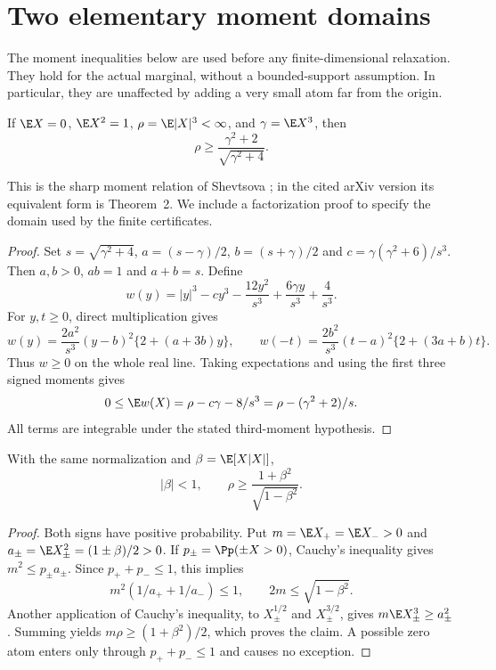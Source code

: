 \section{Two elementary moment domains}\label{ms:moment-domain}

The moment inequalities below are used before any finite-dimensional
relaxation. They hold for the actual marginal, without a bounded-support
assumption. In particular, they are unaffected by adding a very small
atom far from the origin.

\begin{theorem}\label{ms:sharp-third}
If $\E X=0$, $\E X^2=1$, $\rho=\E|X|^3<\infty$, and
$\gamma=\E X^3$, then
\[
 \rho\ge\frac{\gamma^2+2}{\sqrt{\gamma^2+4}}.
\]
\end{theorem}
This is the sharp moment relation of Shevtsova
\cite{shevtsova2014complex}; in the cited arXiv version its equivalent
form is Theorem~2. We include a factorization proof to specify the
domain used by the finite certificates.
\begin{proof}
Set $s=\sqrt{\gamma^2+4}$, $a=(s-\gamma)/2$, $b=(s+\gamma)/2$ and
$c=\gamma(\gamma^2+6)/s^3$. Then $a,b>0$, $ab=1$ and $a+b=s$.
Define
\[
 w(y)=|y|^3-cy^3-\frac{12y^2}{s^3}
                          +\frac{6\gamma y}{s^3}+\frac4{s^3}.
\]
For $y,t\ge0$, direct multiplication gives
\[
 w(y)=\frac{2a^2}{s^3}(y-b)^2\{2+(a+3b)y\},\qquad
 w(-t)=\frac{2b^2}{s^3}(t-a)^2\{2+(3a+b)t\}.
\]
Thus $w\ge0$ on the whole real line. Taking expectations and using the
first three signed moments gives
\[
 0\le\E w(X)=\rho-c\gamma-8/s^3
            =\rho-(\gamma^2+2)/s.
\]
All terms are integrable under the stated third-moment hypothesis.
\end{proof}

\begin{lemma}\label{ms:sign-moment}
With the same normalization and $\beta=\E[X|X|]$,
\[
 |\beta|<1,\qquad
 \rho\ge\frac{1+\beta^2}{\sqrt{1-\beta^2}}.
\]
\end{lemma}
\begin{proof}
Both signs have positive probability. Put
$m=\E X_+=\E X_->0$ and $a_\pm=\E X_\pm^2=(1\pm\beta)/2>0$.
If $p_\pm=\Pp(\pm X>0)$, Cauchy's inequality gives
$m^2\le p_\pm a_\pm$. Since $p_++p_-\le1$, this implies
\[
 m^2(1/a_++1/a_-)\le1,
 \qquad 2m\le\sqrt{1-\beta^2}.
\]
Another application of Cauchy's inequality, to
$X_\pm^{1/2}$ and $X_\pm^{3/2}$, gives
$m\E X_\pm^3\ge a_\pm^2$. Summing yields
$m\rho\ge(1+\beta^2)/2$, which proves the claim. A possible zero atom
enters only through $p_++p_-\le1$ and causes no exception.
\end{proof}
